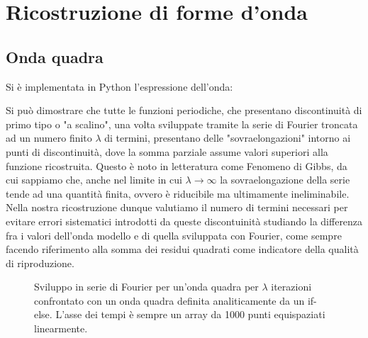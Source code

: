 \documentclass{article}[a4paper, oneside ,11pt]
\begin{document}
\section{Ricostruzione di forme d'onda}
\subsection{Onda quadra}
Si è implementata in Python l'espressione dell'onda:

Si può dimostrare che tutte le funzioni periodiche, che presentano discontinuità di primo tipo o "a scalino", una volta sviluppate tramite la serie di Fourier troncata ad un numero finito $\lambda$ di termini, presentano delle "sovraelongazioni" intorno ai punti di discontinuità, dove la somma parziale assume valori superiori alla funzione ricostruita. Questo è noto in letteratura come Fenomeno di Gibbs\cite{gibbs}, da cui sappiamo che, anche nel limite in cui $\lambda \longrightarrow \infty$ la sovraelongazione della serie tende ad una quantità finita, ovvero è riducibile ma ultimamente ineliminabile. Nella nostra ricostruzione dunque valutiamo il numero di termini necessari per evitare errori sistematici introdotti da queste discontuinità studiando la differenza fra i valori dell'onda modello e di quella sviluppata con Fourier, come sempre facendo riferimento alla somma dei residui quadrati come indicatore della qualità di riproduzione.
\begin{figure}[!htb]
	\scalebox{0.55}{}\hfill \scalebox{0.55}{}
	\scalebox{0.55}{}\hfill \scalebox{0.55}{}
 	\caption{Sviluppo in serie di Fourier per un’onda quadra per $\lambda$ iterazioni confrontato con un onda quadra definita analiticamente da un if-else. L'asse dei tempi è sempre un array da 1000 punti equispaziati linearmente.
 \label{plt:sqw}}
\end{figure}

\end{document}
